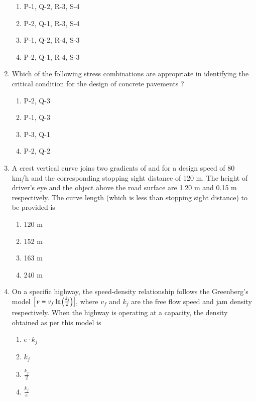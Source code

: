 \documentclass[journal]{IEEEtran}
\begin{document}
\begin{enumerate}
\begin{enumerate}
     \item P-1, Q-2, R-3, S-4
     \item P-2, Q-1, R-3, S-4
     \item P-1, Q-2, R-4, S-3
     \item P-2, Q-1, R-4, S-3 \\
 \end{enumerate}
\item Which of the following stress combinations are appropriate in identifying the critical condition for the design of concrete pavements ?
\begin{table}[h!]
  \centering
  
\end{table} 
\begin{enumerate}
     \item P-2, Q-3
     \item P-1, Q-3
     \item P-3, Q-1
     \item P-2, Q-2 \\
 \end{enumerate}
\item A crest vertical curve joins two gradients of  and  for a design speed of 80 km/h and the corresponding stopping sight distance of 120 m. The height of driver's eye and the object above the road surface are 1.20 m and 0.15 m respectively. The curve length (which is less than stopping sight distance) to be provided is
\begin{enumerate}
    \item 120 m
    \item 152 m
    \item 163 m
    \item 240 m \\
\end{enumerate}
\item On a specific highway, the speed-density relationship follows the Greenberg's model ${}\left[v = v_f \ln{\ensuremath{\left(\frac{k_j}{k}\right)}}\right]$, where $v_f$ and $k_j$ are the free flow speed and jam density respectively. When the highway is operating at a capacity, the density obtained as per this model is
\begin{enumerate}
    \item $e \cdot k_j$
    \item $k_j$
    \item $\frac{k_j}{2}$
    \item $\frac{k_j}{e}$ \\
\end{enumerate}

\end{enumerate}
\end{document}
